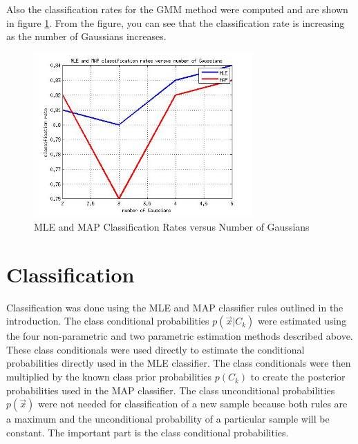 \documentclass[journal]{IEEEtran}
\begin{document}
\par Also the classification rates for the GMM method were computed and are shown in figure \ref{fig:ClassRate_GMM}. From the figure, you can see that the classification rate is increasing as the number of Gaussians increases. 

\begin{figure}
\centering
\includegraphics[width=3.3in]{../images/ClassRate_GMM.jpg}
\caption{MLE and MAP Classification Rates versus Number of Gaussians}
\label{fig:ClassRate_GMM}
\end{figure}

\section{Classification}
\par Classification was done using the MLE and MAP classifier rules outlined in the introduction. The class conditional probabilities \(p(\vec{x}\vert C_k)\) were estimated using the four non-parametric and two parametric estimation methods described above. These class conditionals were used directly to estimate the conditional probabilities directly used in the MLE classifier. The class conditionals were then multiplied by the known class prior probabilities \(p(C_k)\) to create the posterior probabilities used in the MAP classifier. The class unconditional probabilities \(p(\vec{x})\) were not needed for classification of a new sample because both rules are a maximum and the unconditional probability of a particular sample will be constant. The important part is the class conditional probabilities.
\end{document}

